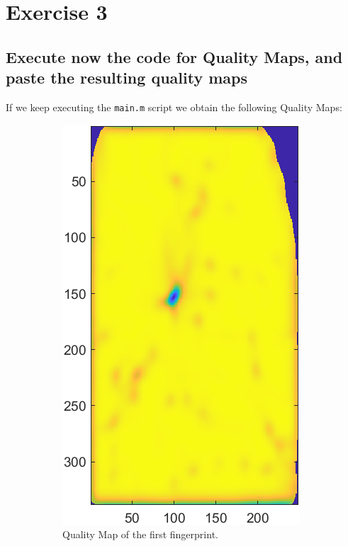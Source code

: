 \documentclass[a4paper]{article}
\def\inline{\lstinline[basicstyle=\ttfamily,keywordstyle={}]}
\begin{document}
\section{Exercise 3}
\subsection{ Execute now the code for Quality Maps, and paste the resulting quality maps}

If we keep executing the \inline{main.m} script we obtain the following Quality Maps:



\begin{figure}[H]
  \centering
       \begin{subfigure}[t]{0.45\textwidth}
         \centering
         \includegraphics[scale=0.6]{Figures/QMap1}
         \caption{Quality Map of the first fingerprint.}
     \end{subfigure}%
     \quad
     \begin{subfigure}[t]{0.45\textwidth}
         \centering

\end{subfigure}
\end{figure}
\end{document}

